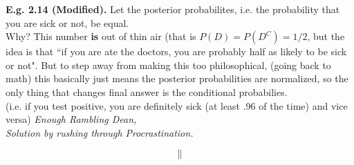 \documentclass[12pt]{book}
\begin{document}
\textbf{E.g. 2.14 (Modified). } Let the posterior probabilites, i.e. the probability that you are sick or not, be equal. \\

Why? This number \textbf{is} out of thin air (that is $P(D)=P(D^C)=1/2$, but the idea is that ``if you are ate the doctors, you are probably half as likely to be sick or not". But to step away from making this too philosophical, (going back to math) this basically just means the posterior probabilities are normalized, so the only thing that changes final answer is the conditional probabilies. \\

(i.e. if you test positive, you are definitely sick \scriptsize{(at least .96 of the time)} \normalsize and vice versa)
\newpage
\noindent \textit{Enough Rambling Dean, \\Solution by rushing through Procrastination. }\\
\begin{center}
\end{center}
$$\parallel$$
\begin{center}
\end{center}
\end{document}
